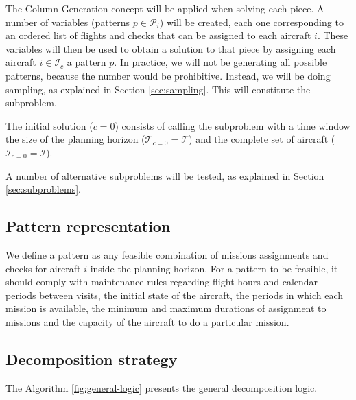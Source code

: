 \documentclass[a4paper,11pt]{article}
\begin{document}
  The Column Generation concept will be applied when solving each piece. A number of variables (patterns $p \in \mathcal{P}_i$) will be created, each one corresponding to an ordered list of flights and checks that can be assigned to each aircraft $i$. These variables will then be used to obtain a solution to that piece by assigning each aircraft $i \in \mathcal{I}_{c}$ a pattern $p$. In practice, we will not be generating all possible patterns, because the number would be prohibitive. Instead, we will be doing sampling, as explained in Section \ref{sec:sampling}. This will constitute the subproblem.

  The initial solution ($c=0$) consists of calling the subproblem with a time window the size of the planning horizon ($\mathcal{T}_{c=0} = \mathcal{T}$) and the complete set of aircraft ($\mathcal{I}_{c=0} = \mathcal{I}$).

  A number of alternative subproblems will be tested, as explained in Section \ref{sec:subproblems}.

  \subsection{Pattern representation}

    We define a pattern as any feasible combination of missions assignments and checks for aircraft $i$ inside the planning horizon. For a pattern to be feasible, it should comply with maintenance rules regarding flight hours and calendar periods between visits, the initial state of the aircraft, the periods in which each mission is available, the minimum and maximum durations of assignment to missions and the capacity of the aircraft to do a particular mission.

  \subsection{Decomposition strategy}

  The Algorithm \ref{fig:general-logic} presents the general decomposition logic.
\end{document}
